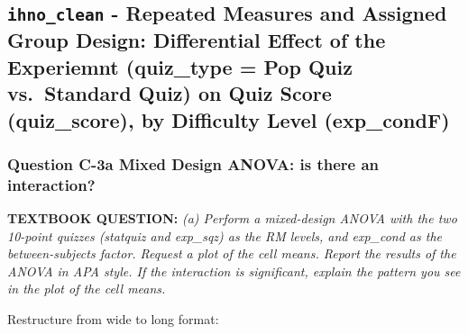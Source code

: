 \documentclass[
]{article}
\newenvironment{Shaded}{\begin{snugshade}}{\end{snugshade}}
\newcommand{\DataTypeTok}[1]{\textcolor[rgb]{0.13,0.29,0.53}{#1}}
\newcommand{\KeywordTok}[1]{\textcolor[rgb]{0.13,0.29,0.53}{\textbf{#1}}}
\newcommand{\NormalTok}[1]{#1}
\newcommand{\OperatorTok}[1]{\textcolor[rgb]{0.81,0.36,0.00}{\textbf{#1}}}
\newcommand{\StringTok}[1]{\textcolor[rgb]{0.31,0.60,0.02}{#1}}
\begin{document}
\hypertarget{ihno_clean---repeated-measures-and-assigned-group-design-differential-effect-of-the-experiemnt-quiz_type-pop-quiz-vs.-standard-quiz-on-quiz-score-quiz_score-by-difficulty-level-exp_condf}{%
\subsection{\texorpdfstring{\texttt{ihno\_clean} - Repeated Measures and
Assigned Group Design: Differential Effect of the Experiemnt (quiz\_type
= Pop Quiz vs.~Standard Quiz) on Quiz Score (quiz\_score), by Difficulty
Level
(exp\_condF)}{ihno\_clean - Repeated Measures and Assigned Group Design: Differential Effect of the Experiemnt (quiz\_type = Pop Quiz vs.~Standard Quiz) on Quiz Score (quiz\_score), by Difficulty Level (exp\_condF)}}\label{ihno_clean---repeated-measures-and-assigned-group-design-differential-effect-of-the-experiemnt-quiz_type-pop-quiz-vs.-standard-quiz-on-quiz-score-quiz_score-by-difficulty-level-exp_condf}}

\hypertarget{question-c-3a-mixed-design-anova-is-there-an-interaction}{%
\subsubsection{Question C-3a Mixed Design ANOVA: is there an
interaction?}\label{question-c-3a-mixed-design-anova-is-there-an-interaction}}

\textbf{TEXTBOOK QUESTION:} \emph{(a) Perform a mixed-design ANOVA with
the two 10-point quizzes (statquiz and exp\_sqz) as the RM levels, and
exp\_cond as the between-subjects factor. Request a plot of the cell
means. Report the results of the ANOVA in APA style. If the interaction
is significant, explain the pattern you see in the plot of the cell
means.}

Restructure from wide to long format:

\begin{Shaded}
\end{Shaded}
\end{document}
